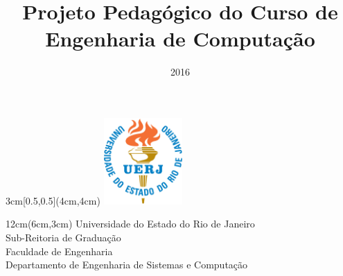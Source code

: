 \documentclass[envcountsame,envcountchap,openany]{svmono}
\begin{document}
\begin{textblock*}{3cm}[0.5,0.5](4cm,4cm)
    \includegraphics[width=3cm]{imagens/logo_uerj_cor.jpg}
\end{textblock*}
\begin{textblock*}{12cm}(6cm,3cm)   %
    Universidade do Estado do Rio de Janeiro\\
    Sub-Reitoria de Graduação \\
    Faculdade de Engenharia\\
    Departamento de Engenharia de Sistemas e Computação
\end{textblock*}



\title{Projeto Pedagógico do Curso de Engenharia de Computação}
\subtitle{2016}
\date{}
\maketitle
\pagestyle{empty}
\vfill

\tableofcontents
\listoftables

\frontmatter%
%
% 



\mainmatter%
%
\pagestyle{fancy}

%
\backmatter%

\appendix
\appendixpage

\addappheadtotoc



\end{document}
